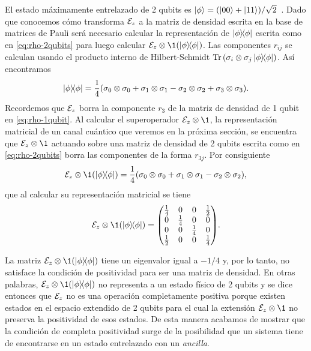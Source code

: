 El estado máximamente entrelazado de 2 qubits es
$\ket{\phi}=\qty(\ket{00}+\ket{11})/\sqrt{2}$~\cite{bengtsson_zyczkowski_2017}.
Dado que conocemos cómo transforma $\mathcal{E}_z$ a la matriz de densidad 
escrita en la base de matrices de Pauli será necesario calcular 
la representación de $\dyad{\phi}{\phi}$ escrita como en \eqref{eq:rho-2qubits}
para luego calcular $\E_z\ot \1(\dyad{\phi}{\phi})$.
Las componentes $r_{ij}$ se calculan usando el producto interno
de Hilbert-Schmidt $\Tr\qty(\pauli{i}{j}\dyad{\phi}{\phi})$.
Así encontramos 
\begin{align}
\dyad{\phi}{\phi}=\frac{1}{4}\qty(
\pauli{0}{0}+\pauli{1}{1}-\pauli{2}{2}+\pauli{3}{3}).
\end{align}
Recordemos que $\mathcal{E}_z$ borra la componente $r_3$ de la
matriz de densidad de 1 qubit en \eqref{eq:rho-1qubit}. 
Al calcular el superoperador $\E_z\ot  \1$, la representación matricial de 
un canal cuántico que veremos en la próxima sección, se encuentra
que $\E_z\otimes\1$ actuando sobre una matriz de densidad de 2 qubits
escrita como en \eqref{eq:rho-2qubits} borra
las componentes de la forma $r_{3j}$. Por consiguiente
\begin{align}
\E_z\otimes\1 \qty(\dyad{\phi}{\phi})=\frac{1}{4}\qty(
\pauli{0}{0}+\pauli{1}{1}-\pauli{2}{2}),
\end{align}
que al calcular su representación matricial se tiene
\begin{align}
\E_z\otimes\1 \qty(\dyad{\phi}{\phi})=
\mqty( 
\frac{1}{4} & 0 & 0 & \frac{1}{2} \\
0 & \frac{1}{4} & 0 & 0 \\
0 & 0 & \frac{1}{4} & 0 \\
\frac{1}{2} & 0 & 0 & \frac{1}{4} \\
).
\end{align}

La matriz  $\E_z\otimes\1\qty(\dyad{\phi}{\phi})$ tiene un 
eigenvalor igual a $-1/4$ y, por lo tanto, no satisface la condición 
de positividad para ser una matriz de densidad.  
En otras palabras, $\E_z\otimes\1\qty(\dyad{\phi}{\phi})$ 
no representa a un estado físico de 2 qubits y 
se dice entonces que $\mathcal{E}_z$ no es una operación completamente 
positiva porque existen estados en el espacio extendido de 2 qubits para 
el cual la extensión $\E_z\ot \1$ no preserva la positividad de esos estados. 
De esta manera acabamos de mostrar que la condición de completa
positividad surge de la posibilidad que un sistema tiene de encontrarse 
en un estado entrelazado con un \textit{ancilla}.


